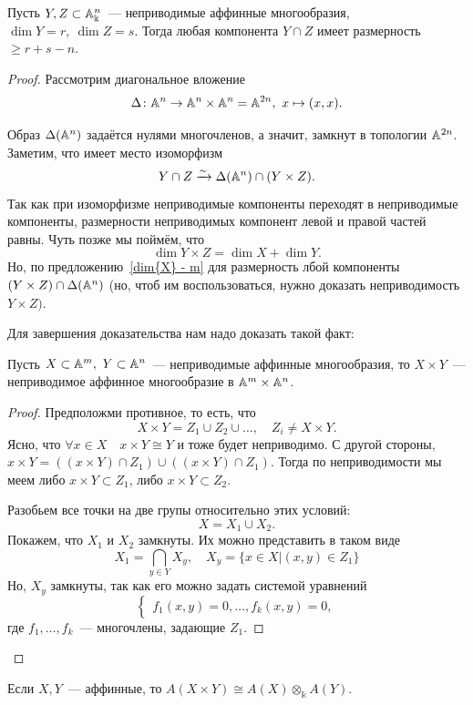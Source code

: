 	    \begin{theorem} 
	    	Пусть $Y, Z \subset \AA_{\Bbbk}^n$~--- неприводимые аффинные многообразия, $\dim{Y} = r, \ \dim{Z} = s$. Тогда любая компонента $Y \cap Z$ имеет размерность $\ge r + s - n$.
	    \end{theorem}
	    \begin{proof}
	    	Рассмотрим диагональное вложение 
	    	\[
	    		\Delta\colon \AA^n \to \AA^{n} \times \AA^{n} = \AA^{2n}, \ x \mapsto (x, x). 
	    	\]

	    	Образ $\Delta(\AA^n)$ задаётся нулями многочленов, а значит, замкнут в топологии $\AA^{2n}$. Заметим, что имеет место изоморфизм 
	    	\[
	    		Y \cap Z \xrightarrow{\sim} \Delta\lr*{\AA^n} \cap (Y \times Z).
	    	\]
	    	Так как при изоморфизме неприводимые компоненты переходят в неприводимые компоненты, размерности неприводимых компонент левой и правой частей равны. Чуть позже мы поймём, что 
	    	\[
	    		\dim{Y \times Z} = \dim{X} + \dim{Y}.
	    	\]
	    	Но, по предложению~\ref{dim{X} - m} для размерность лбой компоненты $(Y \times Z) \cap \Delta(\AA^n)$ (но, чтоб им воспользоваться, нужно доказать неприводимость $Y \times Z)$. 

	    	Для завершения доказательства нам надо доказать такой факт: 

	    	\begin{statement} 
	    		Пусть $X \subset \AA^m, \ Y \subset \AA^n$~--- неприводимые аффинные многообразия, то $X \times Y$~--- неприводимое аффинное многообразие в $\AA^{m} \times \AA^{n}$.
	    	\end{statement}
	    	\begin{proof}
	    		Предположми противное, то есть, что 
	    		\[
	    			X \times Y = Z_1 \cup Z_2 \cup \ldots, \quad Z_i \neq X \times Y. 
	    		\]
	    		Ясно, что $\forall x \in X \quad x \times Y \cong Y$ и тоже будет неприводимо. С другой стороны, $x \times Y = ((x \times Y) \cap Z_1) \cup ((x \times Y)\cap Z_1 )$. Тогда по неприводимости мы меем либо $x \times Y \subset Z_1$, либо $x \times Y \subset Z_2$. 

	    		Разобьем все точки на две групы относительно этих условий: 
	    		\[
	    			X = X_1 \cup X_2.
	    		\]
	    		Покажем, что $X_1$ и $X_2$ замкнуты. Их можно представить в таком виде 
	    		\[
	    			X_{1} = \bigcap_{y \in Y} X_{y}, \quad X_{y} = \{ x \in X \vert (x, y) \in Z_1\}
	    		\]
	    		Но, $X_{y}$ замкнуты, так как его можно задать системой уравнений 
	    		\[
	    			\begin{cases} f_1(x, y) = 0, \ldots, f_k(x, y) = 0, \end{cases}
	    		\]
	    		где $f_1, \ldots, f_k$~--- многочлены, задающие $Z_1$.
	    	\end{proof}

	    \end{proof}

    	\begin{exercise}
			Если $X, Y$~--- аффинные, то $A(X \times Y) \cong A(X) \otimes_{\Bbbk} A(Y)$.    
    	\end{exercise}
